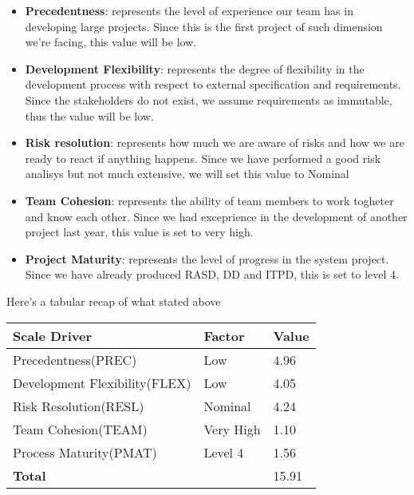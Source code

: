 \begin{itemize}
\item \textbf{Precedentness}: represents the level of experience our team has in developing large projects. Since this is the first project of such dimension we're facing, this value will be low.
\item \textbf{Development Flexibility}: represents the degree of flexibility in the development process with respect to external specification and requirements. Since the stakeholders do not exist, we assume requirements as immutable, thus the value will be low.
\item \textbf{Risk resolution}: represents how much we are aware of risks and how we are ready to react if anything happens. Since we have performed a good risk analisys but not much extensive, we will set this value to Nominal
\item \textbf{Team Cohesion}: represents the ability of team members to work togheter and know each other. Since we had exceprience in the development of another project last year, this value is set to very high.
\item \textbf{Project Maturity}: represents the level of progress in the system project. Since we have already produced RASD, DD and ITPD, this is set to level 4.
\end{itemize}
Here's a tabular recap of what stated above\\
\begin{tabular}{|p{6cm}|p{3cm}|p{2cm}|}
\hline
\textbf{Scale Driver} & \textbf{Factor} & \textbf{Value}\\
\hline
Precedentness(PREC) & Low & 4.96\\
Development Flexibility(FLEX) & Low & 4.05\\
Risk Resolution(RESL) & Nominal & 4.24\\
Team Cohesion(TEAM) & Very High & 1.10\\
Process Maturity(PMAT) & Level 4 & 1.56\\
\hline
\multicolumn{2}{|l|}{\textbf{Total}} & 15.91\\
\hline
\end{tabular}
